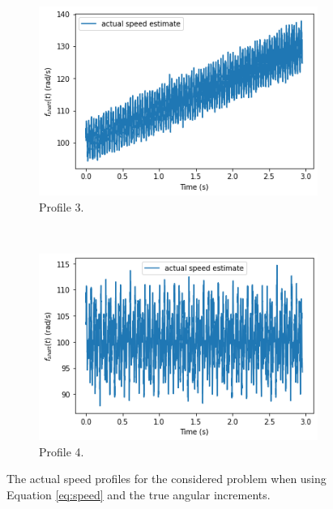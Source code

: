 \documentclass{article}
\begin{document}
\begin{figure}[htb!]
		\begin{subfigure}[b]{0.45\textwidth}
			\centering
			\includegraphics[width=\textwidth]{Q4_f3_actual.png}
			\caption{Profile 3.}
		\end{subfigure}
		~
		\begin{subfigure}[b]{0.45\textwidth}
			\centering
			\includegraphics[width=\textwidth]{Q4_f4_actual.png}
			\caption{Profile 4.}
		\end{subfigure}
		
		\caption{The actual speed profiles for the considered problem when using Equation \eqref{eq:speed} and the true angular increments.}
		\label{fig:Q4_profiles_actual}
	\end{figure}
\end{document}
